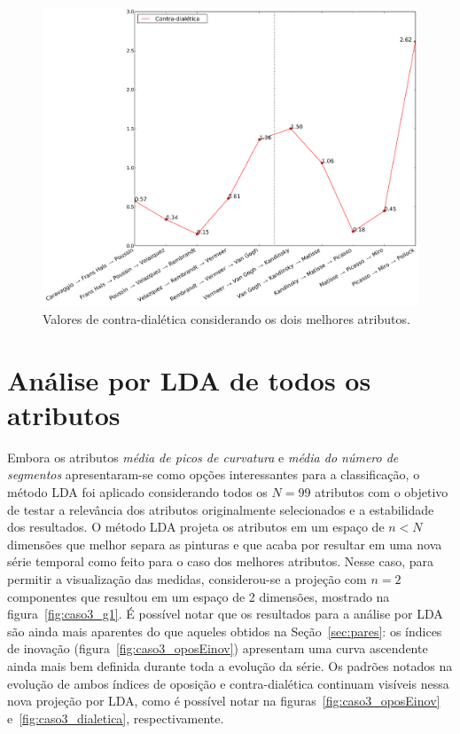 \begin{figure}[h!]
\begin{center}
       \caption{Valores de contra-dialética considerando os dois melhores atributos.}
        \label{fig:caso1_dialetica}
        \includegraphics[width=\columnwidth]{figs/caso1_dialetica}
        \fonteminha
\end{center}
\end{figure}

\section{Análise por LDA de todos os atributos}
\label{subsec:lda}

Embora os atributos \emph{média de picos de curvatura} e \emph{média
  do número de segmentos} apresentaram-se como opções interessantes
para a classificação, o método LDA foi aplicado considerando todos os
$N = 99$ atributos com o objetivo de testar a relevância dos atributos
originalmente selecionados e a estabilidade dos resultados. O método
LDA projeta os atributos em um espaço de $n < N$ dimensões que melhor
separa as pinturas e que acaba por resultar em uma nova série temporal
como feito para o caso dos melhores atributos. Nesse caso, para
permitir a visualização das medidas, considerou-se a projeção com $n =
2$ componentes que resultou em um espaço de 2 dimensões, mostrado na
figura~\ref{fig:caso3_g1}. É possível notar que os resultados para a
análise por LDA são ainda mais aparentes do que aqueles obtidos na
Seção~\ref{sec:pares}: os índices de inovação
(figura~\ref{fig:caso3_oposEinov}) apresentam uma curva ascendente
ainda mais bem definida durante toda a evolução da série. Os padrões
notados na evolução de ambos índices de oposição e contra-dialética
continuam visíveis nessa nova projeção por LDA, como é possível notar
na figuras~\ref{fig:caso3_oposEinov} e~\ref{fig:caso3_dialetica},
respectivamente.

